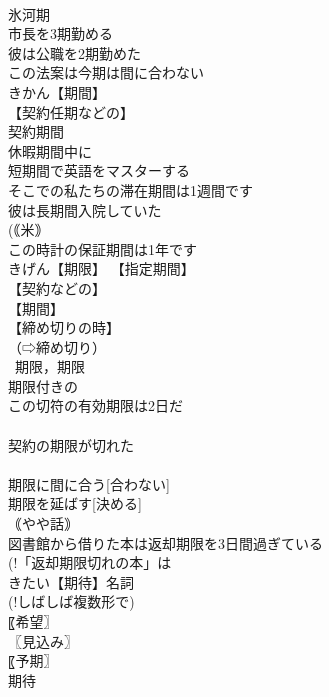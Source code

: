 \documentclass[8pt]{extreport}
\begin{document}
\begin{CJK}{UTF8}{min}
\\	氷河期 
\\	市長を3期勤める 
\\	彼は公職を2期勤めた 
\\	この法案は今期は間に合わない 
\\	きかん【期間】 
\\	【契約任期などの】
\\	契約期間 
\\	休暇期間中に 
\\	短期間で英語をマスターする 
\\	そこでの私たちの滞在期間は1週間です 
\\	彼は長期間入院していた 
\\	(｟米｠ 
\\	この時計の保証期間は1年です 
\\	きげん【期限】 【指定期間】
\\	【契約などの】
\\	【期間】
\\	【締め切りの時】
\\	（⇨締め切り） 
\\	~期限，期限~ 
\\	期限付きの 
\\	この切符の有効期限は2日だ 
\\	[｟書｠ 
\\	(!「有効期限二日の切符」は 
\\	納税期限まであと10日しかない 
\\	期限が[は] 
\\	契約の期限が切れた 
\\	[｟やや書｠ 
\\	手形の期限が5月19日に来る 
\\	会話 
\\	「その請求書の支払い期限はいつですか」「5月10日です」 
\\	期限に[を] 
\\	期限に間に合う[合わない] 
\\	期限を延ばす[決める] 
\\	｟やや話｠ 
\\	図書館から借りた本は返却期限を3日間過ぎている 
\\	(!「返却期限切れの本」は 
\\	きたい【期待】名詞 
\\	(!しばしば複数形で) 
\\	〖希望〗
\\	〖見込み〗
\\	〖予期〗
\\	期待~ 

\end{CJK}
\end{document}
